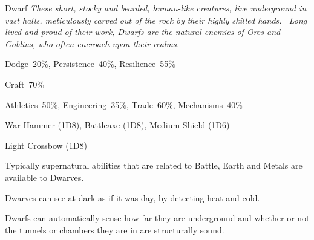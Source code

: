\newpage



\begin{monsterbox}{Dwarf}
	\textit{These short, stocky and bearded, human-like creatures, live underground in vast halls, meticulously carved out of the rock by their highly skilled hands.  Long lived and proud of their work, Dwarfs are the natural enemies of Orcs and Goblins, who often encroach upon their realms.}\\
	\rpghline
	\basics[%
        hitpoints  = 15, %
	majorwound = 8,
	damagemodifier = 0,
	powerpoints = 11,
	movementrate = 12m,
	armor = Chainmail (5AP),
	plunderrating = 3
	]
	\rpghline%
	\stats[ %
		STR = 4D6   (14),
		CON = 2D6+12 (19),
		DEX = 3D6   (11),
		SIZ = 1D6   (7),
		INT = 2D6+6 (13),
		POW = 3D6   (11),
		CHA = 3D6   (11)
	]
	\rpghline%
	\begin{rpg-monsteraction}[Resistances]
		Dodge~20\%, Persistence~40\%, Resilience~55\%
	\end{rpg-monsteraction}
	\begin{rpg-monsteraction}[Knowledge]
    		Craft~70\%
	\end{rpg-monsteraction}
	\begin{rpg-monsteraction}[Practical]
		Athletics~50\%, Engineering~35\%, Trade~60\%, Mechanisms~40\%
	\end{rpg-monsteraction}
	\begin{rpg-monsteraction}
		War Hammer (1D8), Battleaxe (1D8), Medium Shield (1D6)
	\end{rpg-monsteraction}
	\begin{rpg-monsteraction}
		Light Crossbow (1D8)
	\end{rpg-monsteraction}
	\begin{rpg-monsteraction}[Supernatural]
		Typically supernatural abilities that are related to Battle, Earth and Metals are available to Dwarves.
	\end{rpg-monsteraction}
	\begin{rpg-monsteraction}[Thermoception]
		Dwarves can see at dark as if it was day, by detecting heat and cold.
	\end{rpg-monsteraction}
	\begin{rpg-monsteraction}
		Dwarfs can automatically sense how far they are underground and whether or not the tunnels or chambers they are in are structurally sound.
	\end{rpg-monsteraction}

\end{monsterbox}

